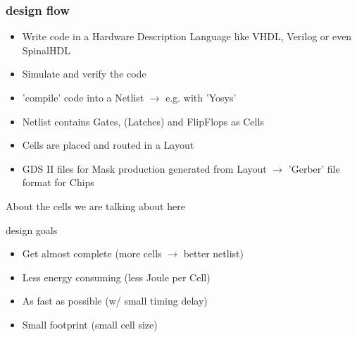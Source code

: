 \documentclass[aspectratio=169]{beamer}
\begin{document}
\begin{frame}
\frametitle{design flow}
    \begin{itemize}
        \item Write code in a Hardware Description Language like VHDL, Verilog or even SpinalHDL
        \item Simulate and verify the code
        \item 'compile' code into a Netlist $\rightarrow$ e.g. with 'Yosys'
        \item Netlist contains Gates, (Latches) and FlipFlops as Cells
        \item Cells are placed and routed in a Layout
        \item GDS II files for Mask production generated from Layout $\rightarrow$ 'Gerber' file format for Chips
    \end{itemize}

About the cells we are talking about here
\end{frame}


\begin{frame}{design goals}
    \begin{itemize}
        \item Get almost complete (more cells $\rightarrow$ better netlist)
        \item Less energy consuming (less Joule per Cell)
        \item As fast as possible (w/ small timing delay)
        \item Small footprint (small cell size)
    \end{itemize}
\end{frame}

\end{document}

